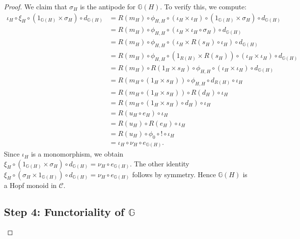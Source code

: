 \documentclass{amsart}
\begin{document}
\begin{proof}
We claim that $\sigma_H$ is the antipode for $\mathbb{G}(H)$. To verify this, we compute:
\begin{align*}
\iota_H \circ \xi_H \circ (1_{\mathbb{G}(H)} \times \sigma_H) \circ d_{\mathbb{G}(H)}
&= R(m_H) \circ \phi_{H,H} \circ (\iota_H \times \iota_H) \circ (1_{\mathbb{G}(H)} \times \sigma_H) \circ d_{\mathbb{G}(H)} \\
&= R(m_H) \circ \phi_{H,H} \circ (\iota_H \times \iota_H \circ \sigma_H) \circ d_{\mathbb{G}(H)} \\
&= R(m_H) \circ \phi_{H,H} \circ (\iota_H \times R(s_H) \circ \iota_H) \circ d_{\mathbb{G}(H)} \\
&= R(m_H) \circ \phi_{H,H} \circ (1_{R(H)} \times R(s_H)) \circ (\iota_H \times \iota_H) \circ d_{\mathbb{G}(H)} \\
&= R(m_H) \circ R(1_H \times s_H) \circ \phi_{H,H} \circ (\iota_H \times \iota_H) \circ d_{\mathbb{G}(H)} \\
&= R(m_H \circ (1_H \times s_H)) \circ \phi_{H,H} \circ d_{R(H)} \circ \iota_H \\
&= R(m_H \circ (1_H \times s_H)) \circ R(d_H) \circ \iota_H \\
&= R(m_H \circ (1_H \times s_H) \circ d_H) \circ \iota_H \\
&= R(u_H \circ e_H) \circ \iota_H \\
&= R(u_H) \circ R(e_H) \circ \iota_H \\
&= R(u_H) \circ \phi_0 \circ ! \circ \iota_H \\
&= \iota_H \circ \nu_H \circ e_{\mathbb{G}(H)}.
\end{align*}
Since $\iota_H$ is a monomorphism, we obtain $\xi_H \circ (1_{\mathbb{G}(H)} \times \sigma_H) \circ d_{\mathbb{G}(H)} = \nu_H \circ e_{\mathbb{G}(H)}$. The other identity $\xi_H \circ (\sigma_H \times 1_{\mathbb{G}(H)}) \circ d_{\mathbb{G}(H)} = \nu_H \circ e_{\mathbb{G}(H)}$ follows by symmetry. Hence $\mathbb{G}(H)$ is a Hopf monoid in $\mathcal{C}$.

\subsection*{Step 4: Functoriality of $\mathbb{G}$}


\end{proof}
\end{document}
